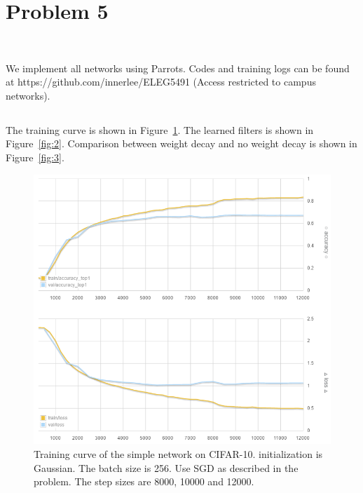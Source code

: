 \section{Problem 5}~\label{sec:prob5}

We implement all networks using Parrots.
Codes and training logs can be found at
https://github.com/innerlee/ELEG5491
(Access restricted to campus networks).

\subsection{} %

The training curve is shown in Figure~\ref{fig:1}.
The learned filters is shown in Figure~\ref{fig:2}.
Comparison between weight decay and no weight decay is shown in Figure~\ref{fig:3}.

\begin{figure}[ht]
\centering
    \includegraphics[width=0.99\linewidth]{fig/curve1}
    \caption{\small
    Training curve of the simple network on CIFAR-10.
    initialization is Gaussian.
    The batch size is 256.
    Use SGD as described in the problem.
    The step sizes are 8000, 10000 and 12000.}
    \label{fig:1}
\end{figure}

